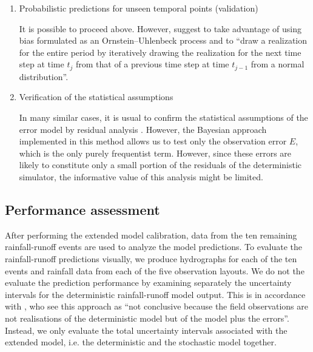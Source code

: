 \documentclass{ctuthesis}\usepackage[]{graphicx}\usepackage[]{color}
\begin{document}
\begin{enumerate}
	
	\item  Probabilistic predictions for unseen temporal points (validation)
	
        It is possible to proceed  above. However, \cite{giudice2013improving} suggest to take advantage of using bias formulated as an Ornstein–Uhlenbeck process and to \enquote{draw a realization for the entire period by iteratively drawing the realization for the next time step at time   $t_ j$ from that of a previous time step at time $t_ {j-1}$ from a normal distribution}. 
	
	
	\item Verification of the statistical assumptions
	
        In many similar cases, it is usual to confirm the statistical assumptions of the error model by residual analysis \citep{reichert2012linking}. However, the Bayesian approach implemented in this method allows us to test only the observation error $E$, which is the only purely frequentist term. However, since these errors are likely to constitute only a small portion of the residuals of the deterministic simulator, the informative value of this analysis might be limited.
        
	
\end{enumerate}




\subsection{Performance assessment}

After performing the extended model calibration, data from the ten remaining rainfall-runoff events are used to analyze the model predictions. To evaluate the rainfall-runoff predictions visually, we produce hydrographs for each of the ten events and rainfall data from each of the five observation layouts. We do not the evaluate the prediction performance  by examining separately the uncertainty intervals for the deterministic rainfall-runoff model output. This is in accordance with \cite{giudice2013improving}, who see this approach as \enquote{not conclusive because the field observations are not realisations of the deterministic model but of the model plus the errors}. Instead, we only evaluate the total uncertainty intervals associated with the extended model, i.e. the deterministic and the stochastic model together. 
\end{document}
